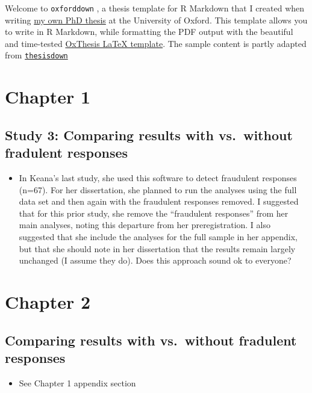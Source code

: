 \documentclass[a4paper, nobind]{templates/ociamthesis}
\providecommand{\tightlist}{%
  \setlength{\itemsep}{0pt}\setlength{\parskip}{0pt}}
\newcommand*{\bibtitle}{Works Cited}
\begin{document}
Welcome to \texttt{oxforddown} \autocite{lyngsOxforddown2019}, a thesis template for R Markdown that I created when writing \href{https://ulyngs.github.io/phd-thesis/}{my own PhD thesis} at the University of Oxford.
This template allows you to write in R Markdown, while formatting the PDF output with the beautiful and time-tested \href{https://github.com/mcmanigle/OxThesis}{OxThesis LaTeX template}.
The sample content is partly adapted from \href{https://github.com/ismayc/thesisdown}{\texttt{thesisdown}}

\startappendices

\hypertarget{chapter-1}{%
\section{Chapter 1}\label{chapter-1}}

\hypertarget{study-3-comparing-results-with-vs.-without-fradulent-responses}{%
\subsection{Study 3: Comparing results with vs.~without fradulent responses}\label{study-3-comparing-results-with-vs.-without-fradulent-responses}}

\begin{itemize}
\tightlist
\item
  In Keana's last study, she used this software to detect fraudulent responses (n=67). For her dissertation, she planned to run the analyses using the full data set and then again with the fraudulent responses removed. I suggested that for this prior study, she remove the ``fraudulent responses'' from her main analyses, noting this departure from her preregistration. I also suggested that she include the analyses for the full sample in her appendix, but that she should note in her dissertation that the results remain largely unchanged (I assume they do). Does this approach sound ok to everyone?
\end{itemize}

\hypertarget{chapter-2}{%
\section{Chapter 2}\label{chapter-2}}

\hypertarget{comparing-results-with-vs.-without-fradulent-responses}{%
\subsection{Comparing results with vs.~without fradulent responses}\label{comparing-results-with-vs.-without-fradulent-responses}}

\begin{itemize}
\tightlist
\item
  See Chapter 1 appendix section
\end{itemize}


\setlength{\baselineskip}{0pt} %

{\renewcommand*\MakeUppercase[1]{#1}%
\printbibliography[heading=bibintoc,title={\bibtitle}]}
\end{document}
